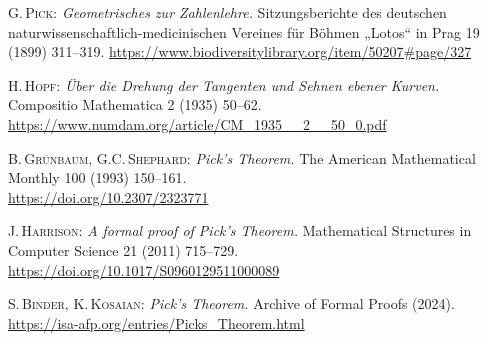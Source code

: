 \documentclass[a4paper]{amsart}
\numberwithin{equation}{section}
\theoremstyle{plain}
\theoremstyle{definition}
\begin{document}
\begin{thebibliography}{8}

  \textsc{G.\,Pick:} \textit{Geometrisches zur Zahlenlehre.}
  Sitzungsberichte des deutschen naturwissenschaftlich-medicinischen Vereines für Böhmen
  „Lotos“ in Prag 19 (1899) 311--319. %
  \url{https://www.biodiversitylibrary.org/item/50207#page/327}
  
  \textsc{H.\,Hopf:} \textit{Über die Drehung der Tangenten und Sehnen ebener Kurven.}
  Compositio Mathematica 2 (1935) 50--62.
  \url{https://www.numdam.org/article/CM_1935__2__50_0.pdf}

  \textsc{B.\,Grünbaum, G.C.\,Shephard:} \textit{Pick's Theorem.}
  The American Mathematical Monthly 100 (1993) 150--161.
  \\ \url{https://doi.org/10.2307/2323771}

  \textsc{J.\,Harrison:} \textit{A formal proof of Pick’s Theorem.}
  Mathematical Structures in Computer Science 21 (2011) 715--729.
  \url{https://doi.org/10.1017/S0960129511000089}
  
  \textsc{S.\,Binder, K.\,Kosaian:} \textit{Pick's Theorem.}
  Archive of Formal Proofs (2024).
  \\ \url{https://isa-afp.org/entries/Picks_Theorem.html}
  
\end{thebibliography}

\end{document}

